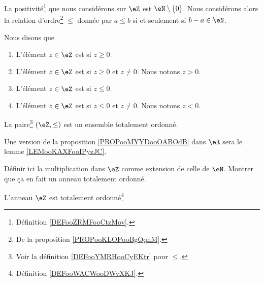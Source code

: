 \begin{definition}	\label{DEFooYMRHooCyEKtr}
	La positivité\footnote{Définition \ref{DEFooZRMFooCtzMov}.} que nous considérons sur \( \eZ\) est \( \eN\setminus\{ 0 \}\). Nous considérons alors la relation d'ordre\footnote{De la proposition \ref{PROPooKLOPooBgQqhM}.} \( \leq\) donnée par \( a\leq b\) si et seulement si \( b-a\in \eN\).

	Nous disons que
	\begin{enumerate}
		\item
		      L'élément \( z\in \eZ\) est  si \( z\geq 0\).
		\item
		      L'élément \( z\in \eZ\) est  si \( z\geq 0\) et \( z\neq 0\). Nous notons \( z>0\).
		\item
		      L'élément \( z\in \eZ\) est  si \( z\leq 0\).
		\item
		      L'élément \( z\in \eZ\) est  si \( z\leq 0\) et \( z\neq 0\). Nous notons \( z<0\).
	\end{enumerate}
\end{definition}

\begin{propositionDef}       \label{PROPooMYYDooOABOdB}
	La paire\footnote{Voir la définition \ref{DEFooYMRHooCyEKtr} pour \( \leq\).} \( (\eZ, \leq)\) est un ensemble totalement ordonné.
\end{propositionDef}

\begin{normaltext}	\label{NORMooOrdreEntiersRelatifsExtension}
	Une version de la proposition \ref{PROPooMYYDooOABOdB} dans \( \eR\) sera le lemme \ref{LEMooKAXFooIPyzJC}.
\end{normaltext}

\begin{probleme}	\label{TODOooDefinirMultiplicationRelatifs}
	Définir ici la multiplication dans \( \eZ \) comme extension de celle de \( \eN \). Montrer que ça en fait un anneau totalement ordonné.
\end{probleme}

\begin{proposition}	\label{PROPooADGIooTioqdu}
	L'anneau \( \eZ\) est totalement ordonné\footnote{Définition \ref{DEFooWACWooDWvXKJ}.}
\end{proposition}

